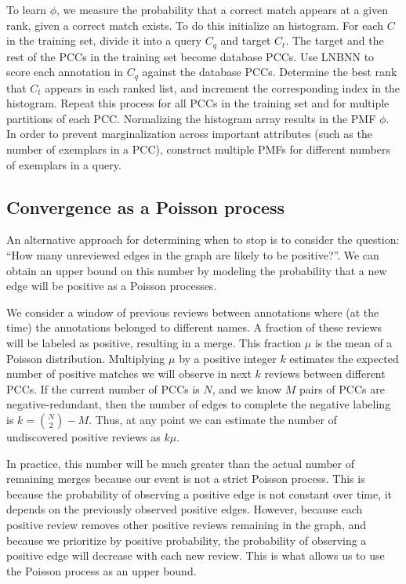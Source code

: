 To learn $\phi$, we measure the probability that a correct match appears at a given rank, given a correct match exists.
To do this initialize an histogram. For each $C$ in the training set, divide it into a query $C_q$ and target $C_t$. The
target and the rest of the PCCs in the training set become database PCCs. Use LNBNN to score each annotation in $C_q$
against the database PCCs. Determine the best rank that $C_t$ appears in each ranked list, and increment the
corresponding index in the histogram. Repeat this process for all PCCs in the training set and for multiple partitions
of each PCC. Normalizing the histogram array results in the PMF $\phi$. In order to prevent marginalization across
important attributes (such as the number of exemplars in a PCC), construct multiple PMFs for different numbers of
exemplars in a query.


\subsection{Convergence as a Poisson process}

An alternative approach for determining when to stop is to consider the question: ``How many unreviewed edges in the
graph are likely to be positive?''. We can obtain an upper bound on this number by modeling the probability that a new
edge will be positive as a Poisson processes.

We consider a window of previous reviews between annotations where (at the time) the annotations belonged to different
names. A fraction of these reviews will be labeled as positive, resulting in a merge. This fraction $\mu$ is the mean of
a Poisson distribution. Multiplying $\mu$ by a positive integer $k$ estimates the expected number of positive matches we
will observe in next $k$ reviews between different PCCs. If the current number of PCCs is $N$, and we know $M$ pairs of
PCCs are negative-redundant, then the number of edges to complete the negative labeling is $k=\binom{N}{2} - M$. Thus,
at any point we can estimate the number of undiscovered positive reviews as $k\mu$.

In practice, this number will be much greater than the actual number of remaining merges because our event is not a
strict Poisson process. This is because the probability of observing a positive edge is not constant over time, it
depends on the previously observed positive edges. However, because each positive review removes other positive reviews
remaining in the graph, and because we prioritize by positive probability, the probability of observing a positive edge
will decrease with each new review. This is what allows us to use the Poisson process as an upper bound.

